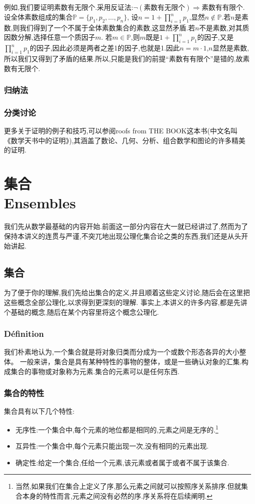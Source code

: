 \documentclass[12pt, a4paper, oneside]{ctexbook}
\begin{document}
  
  例如,我们要证明素数有无限个.采用反证法:$\lnot(\text{素数有无限个})\Rightarrow \text{素数有有限个} $.设全体素数组成的集合$\mathbb{P}=\{p_1,p_2,\dots,p_n\}$,
  设$n=1+\prod _{i=1}^{n}p_1$,显然$n\notin \mathbb{P}$.若$n$是素数,则我们得到了一个不属于全体素数集合的素数,这显然矛盾.若$n$不是素数,对其质因数分解,选择任意一个质因子$m$.
  若$m\in \mathbb{P}$,则$m$既是$1+\prod _{i=1}^{n}p_1$的因子,又是$\prod _{i=1}^{n}p_1$的因子,因此必须是两者之差1的因子,也就是1.因此$n=m\cdot 1$,$n$显然是素数,
  所以我们又得到了矛盾的结果.所以,只能是我们的前提“素数有有限个”是错的,故素数有无限个.
  \subsection{归纳法}
  
  \subsection{分类讨论}



  
  更多关于证明的例子和技巧,可以参阅roofs from THE BOOK这本书(中文名叫《数学天书中的证明》),其涵盖了数论、几何、分析、组合数学和图论的许多精美的证明.
\chapter{集合\\ Ensembles}
  我们先从数学最基础的内容开始.前面这一部分内容在大一就已经讲过了,然而为了保持本讲义的连贯与严谨,不突兀地出现公理化集合论之类的东西,我们还是从头开始讲起.
\section{集合}
  为了便于你的理解,我们先给出集合的定义,并且顺着这些定义讨论,随后会在这里把这些概念全部公理化,以求得到更深刻的理解.
  事实上,本讲义的许多内容,都是先讲个基础的概念,随后在某个内容里将这个概念公理化.
  \subsection{Définition}
  我们朴素地认为,一个集合就是将对象归类而分成为一个或数个形态各异的大小整体。
  一般来讲，集合是具有某种特性的事物的整体，或是一些确认对象的汇集.构成集合的事物或对象称为元素.集合的元素可以是任何东西.
  \subsection{集合的特性}
  集合具有以下几个特性:
  \begin{itemize}
    \item 无序性:一个集合中,每个元素的地位都是相同的,元素之间是无序的.\footnote{
      当然,如果我们在集合上定义了序,那么元素之间就可以按照序关系排序.但就集合本身的特性而言,元素之间没有必然的序.序关系将在后续阐明.
    }
    \item 互异性:一个集合中,每个元素只能出现一次,没有相同的元素出现.
    \item 确定性:给定一个集合,任给一个元素,该元素或者属于或者不属于该集合.\label{myref:确定性}
  \end{itemize}
\end{document}
